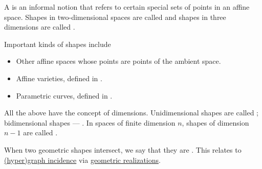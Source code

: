 \begin{remark}\label{rem:geometric_shape}
  A  is an informal notion that refers to certain special sets of points in an affine space. Shapes in two-dimensional spaces are called  and shapes in three dimensions are called .

  Important kinds of shapes include
  \begin{itemize}
    \item Other affine spaces whose points are points of the ambient space.
    \item Affine varieties, defined in .
    \item Parametric curves, defined in .
  \end{itemize}

  All the above have the concept of dimensions. Unidimensional shapes are called ; bidimensional shapes --- . In spaces of finite dimension \( n \), shapes of dimension \( n - 1 \) are called .

  When two geometric shapes intersect, we say that they are . This relates to \hyperref[def:hypergraph/incidence]{(hyper)graph incidence} via \hyperref[def:quiver_geometric_realization]{geometric realizations}.
\end{remark}

